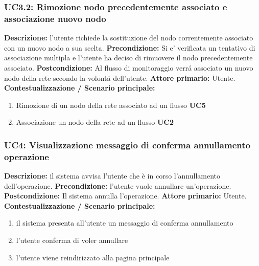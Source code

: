                 \subsubsection{UC3.2: Rimozione nodo precedentemente associato e associazione nuovo nodo}
                    \textbf{Descrizione:} l’utente richiede la sostituzione del nodo correntemente associato con un nuovo nodo a sua scelta.
                    \newline
                    \textbf{Precondizione:}  Si e’ verificata un tentativo di associazione multipla e l’utente ha deciso di rimuovere il nodo precedentemente associato.
                    \newline
                    \textbf{Postcondizione:} Al flusso di monitoraggio verrá associato un nuovo nodo della rete secondo la volontá dell’utente.
                    \newline
                    \textbf{Attore primario:} Utente.
                    \newline
                    \textbf{Contestualizzazione / Scenario principale:} \begin{enumerate}
                        \item Rimozione di un nodo della rete associato ad un flusso \textbf{UC5}
                        \item Associazione un nodo della rete ad un flusso \textbf{UC2}
                    \end{enumerate}
                    
                \subsubsection{UC4: Visualizzazione messaggio di conferma annullamento operazione}
                    \textbf{Descrizione:} il sistema avvisa l’utente che è in corso l’annullamento dell’operazione.
                    \newline
                    \textbf{Precondizione:} l’utente vuole annullare un’operazione.
                    \newline
                    \textbf{Postcondizione:} Il sistema annulla l’operazione.
                    \newline
                    \textbf{Attore primario:} Utente.
                    \newline
                    \textbf{Contestualizzazione / Scenario principale:} \begin{enumerate}
                        \item il sistema presenta all’utente un messaggio di conferma annullamento
                        \item l’utente conferma di voler annullare 
                        \item l’utente viene reindirizzato alla pagina principale
                    \end{enumerate}
                    
